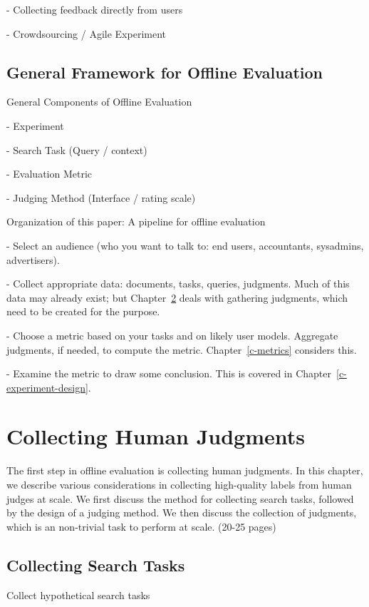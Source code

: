\documentclass[openany]{now} %
\newcommand{\newpar}{\bigskip\noindent}
\begin{document}
- Collecting feedback directly from users \cite{Kim2016}

- Crowdsourcing / Agile Experiment

\section{General Framework for Offline Evaluation}

General Components of Offline Evaluation

-	Experiment

-	Search Task (Query / context)

-	Evaluation Metric

-	Judging Method (Interface / rating scale) 

\newpar
Organization of this paper: A pipeline for offline evaluation

- Select an audience (who you want to talk to: end users, accountants, sysadmins, advertisers). 

- Collect appropriate data: documents, tasks, queries, judgments. Much of this data may already exist; but Chapter~\ref{c-human-judgment} deals with gathering judgments, which need to be created for the purpose.

- Choose a metric based on your tasks and on likely user models. Aggregate judgments, if needed, to compute the metric. Chapter~\ref{c-metrics} considers this.

- Examine the metric to draw some conclusion. This is covered in Chapter~\ref{c-experiment-design}.

\chapter{Collecting Human Judgments}
\label{c-human-judgment}

The first step in offline evaluation is collecting human judgments. In this chapter, we describe various considerations in collecting high-quality labels from human judges at scale. We first discuss the method for collecting search tasks, followed by the design of a judging method. We then discuss the collection of judgments, which is an non-trivial task to perform at scale. (20-25 pages)

\section{Collecting Search Tasks}

Collect hypothetical search tasks
\end{document}
